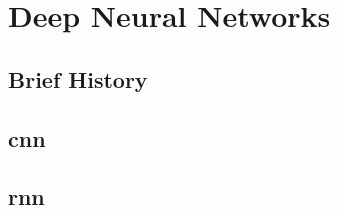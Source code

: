 \section{Deep Neural Networks} \label{sec:bt/DNN}
\subsection{Brief History}
\subsection{\acrlong{cnn}}
\subsection{\acrlong{rnn}}